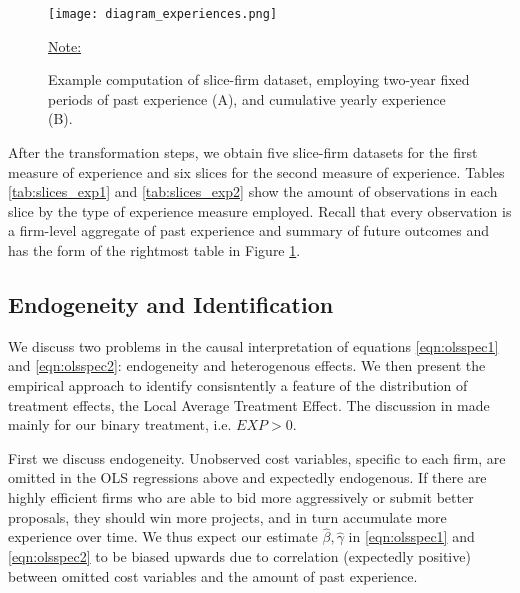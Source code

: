 \begin{figure}
  \texttt{[image: diagram\_experiences.png]}
  \caption{Example computation of slice-firm dataset, employing two-year fixed periods of past experience (A), and cumulative yearly experience (B).}
  \label{fig:diagram_experience}
  \vskip 0.5mm
  { \footnotesize \underline{Note:} }
\end{figure}


After the transformation steps, we obtain five slice-firm datasets for the first measure of experience and six slices for the second measure of experience. Tables \ref{tab:slices_exp1} and \ref{tab:slices_exp2} show the amount of observations in each slice by the type of experience measure employed. Recall that every observation is a firm-level aggregate of past experience and summary of future outcomes and has the form of the rightmost table in Figure \ref{fig:diagram_experience}.








\subsection{Endogeneity and Identification}
We discuss two problems in the causal interpretation of equations \ref{eqn:olsspec1} and \ref{eqn:olsspec2}: endogeneity and heterogenous effects. We then present the empirical approach to identify consisntently a feature of the distribution of treatment effects, the Local Average Treatment Effect. The discussion in made mainly for our binary treatment, i.e. $EXP>0$.

First we discuss endogeneity. Unobserved cost variables, specific to each firm, are omitted in the OLS regressions above and expectedly endogenous. If there are highly efficient firms who are able to bid more aggressively or submit better proposals, they should win more projects, and in turn accumulate more experience over time. We thus expect our estimate $\hat{\beta},\hat{\gamma}$ in \ref{eqn:olsspec1} and \ref{eqn:olsspec2} to be biased upwards due to correlation (expectedly positive) between omitted cost variables and the amount of past experience.

